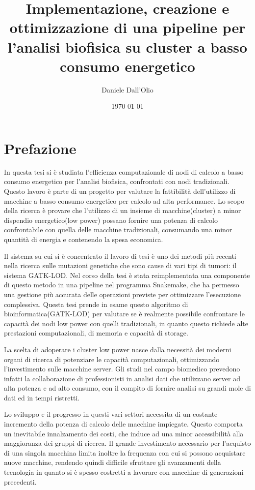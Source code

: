 \documentclass[12pt, a4paper]{report}
\title{Implementazione, creazione e ottimizzazione di una pipeline per l'analisi biofisica su cluster a basso consumo energetico}
\author{Daniele Dall'Olio}
\date{\today}
\begin{document}

\section*{Prefazione}
In questa tesi si è studiata l'efficienza computazionale di nodi di calcolo a basso consumo energetico per l'analisi biofisica, confrontati con nodi tradizionali.
Questo lavoro è parte di un progetto per valutare la fattibilità dell'utilizzo di macchine a basso consumo energetico per calcolo ad alta performance.
Lo scopo della ricerca è provare che l'utilizzo di un insieme di macchine(cluster) a minor dispendio energetico(low power) possano fornire una potenza di calcolo confrontabile con quella delle macchine tradizionali, consumando una minor quantità di energia e contenendo la spesa economica.  

Il sistema su cui si è concentrato il lavoro di tesi è uno dei metodi più recenti nella ricerca sulle mutazioni genetiche che sono cause di vari tipi di tumori: il sistema GATK-LOD.
Nel corso della tesi è stata reimplementata una componente di questo metodo in una pipeline nel programma Snakemake, che ha permesso una gestione più accurata delle operazioni previste per ottimizzare l'esecuzione complessiva. 
Questa tesi prende in esame questo algoritmo di bioinformatica(GATK-LOD) per valutare se è realmente possibile confrontare le capacità dei nodi low power con quelli tradizionali, in quanto questo richiede alte prestazioni computazionali, di memoria e capacità di storage.


La scelta di adoperare i cluster low power nasce dalla necessità dei moderni organi di ricerca di potenziare le capacità computazionali, ottimizzando l'investimento sulle macchine server.
Gli studi nel campo biomedico prevedono infatti la collaborazione di professionisti in analisi dati che utilizzano server ad alta potenza e ad alto consumo, con il compito di fornire analisi su grandi mole di dati ed in tempi ristretti.

Lo sviluppo e il progresso in questi vari settori necessita di un costante incremento della potenza di calcolo delle macchine impiegate.
Questo comporta un inevitabile innalzamento dei costi, che induce ad una minor accessibilità alla maggioranza dei gruppi di ricerca.
Il grande investimento necessario per l'acquisto di una singola macchina limita inoltre la frequenza con cui si possono acquistare nuove macchine, rendendo quindi difficile sfruttare gli avanzamenti della tecnologia in quanto si è spesso costretti a lavorare con macchine di generazioni precedenti.
\end{document}
